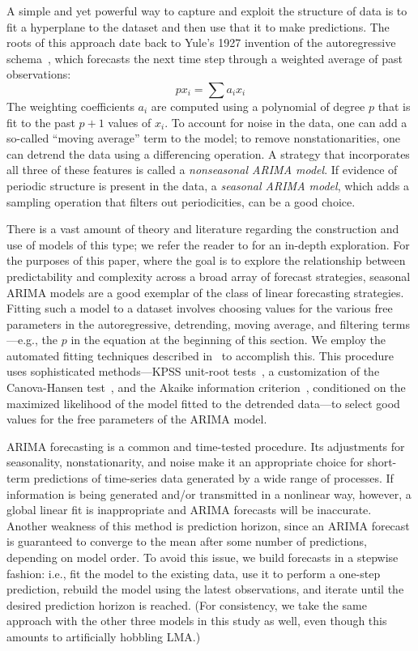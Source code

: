 A simple and yet powerful way to capture and exploit the structure of
data is to fit a hyperplane to the dataset and then use that it to
make predictions.  The roots of this approach date back to Yule's 1927
invention of the autoregressive schema~\cite{weigend93}, which
forecasts the next time step through a weighted average of past
observations: $$px_i = \sum a_i x_i$$ The weighting coefficients $a_i$
are computed using a polynomial of degree $p$ that is fit to the past
$p+1$ values of $x_i$.  To account for noise in the data, one can add
a so-called ``moving average'' term to the model; to remove
nonstationarities, one can detrend the data using a differencing
operation.  A strategy that incorporates all three of these features
is called a \emph{nonseasonal ARIMA model}.  If evidence of periodic
structure is present in the data, a \emph{seasonal ARIMA model}, which
adds a sampling operation that filters out periodicities, can be a
good choice.

There is a vast amount of theory and literature regarding the
construction and use of models of this type; we refer the reader to
\cite{davislinearts} for an in-depth exploration.  For the purposes of
this paper, where the goal is to explore the relationship between
predictability and complexity across a broad array of forecast
strategies, seasonal ARIMA models are a good exemplar of the class of
linear forecasting strategies.  Fitting such a model to a dataset
involves choosing values for the various free parameters in the
autoregressive, detrending, moving average, and filtering
terms---e.g., the $p$ in the equation at the beginning of this
section.  We employ the automated fitting techniques described
in~\cite{autoARIMA} to accomplish this.  This procedure uses
sophisticated methods---KPSS unit-root tests~\cite{KPSSunit}, a
customization of the Canova-Hansen test~\cite{Canova1995}, and the
Akaike information criterion~\cite{akaike1974}, conditioned on the
maximized likelihood of the model fitted to the detrended data---to
select good values for the free parameters of the ARIMA model.

ARIMA forecasting is a common and time-tested procedure.  Its
adjustments for seasonality, nonstationarity, and noise make it an
appropriate choice for short-term predictions of time-series data
generated by a wide range of processes.  If information is being
generated and/or transmitted in a nonlinear way, however, a global
linear fit is inappropriate and ARIMA forecasts will be inaccurate.
Another weakness of this method is prediction horizon, since an ARIMA
forecast is guaranteed to converge to the mean after some number of
predictions, depending on model order.  To avoid this issue, we build
forecasts in a stepwise fashion: i.e., fit the model to the existing
data, use it to perform a one-step prediction, rebuild the model using
the latest observations, and iterate until the desired prediction
horizon is reached.  (For consistency, we take the same approach with
the other three models in this study as well, even though this amounts
to artificially hobbling LMA.)

